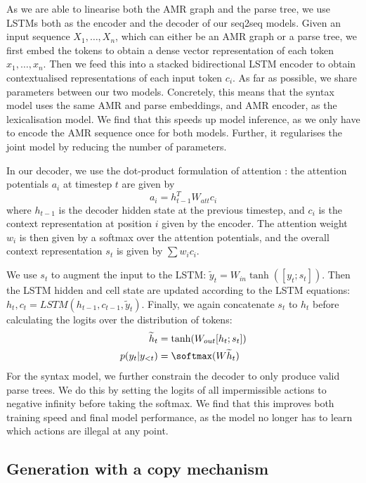 As we are able to linearise both the AMR graph and the parse tree, we use LSTMs \citep{Hochreiter:97} both as the encoder and the decoder of our seq2seq models. Given an input sequence $X_1, \dots, X_n$, which can either be an AMR graph or a parse tree, we first embed the tokens to obtain a dense vector representation of each token $x_1, \dots, x_n$. Then we feed this into a stacked bidirectional LSTM encoder to obtain contextualised representations of each input token $c_i$. As far as possible, we share parameters between our two models. Concretely, this means that the syntax model uses the same AMR and parse embeddings, and AMR encoder, as the lexicalisation model. We find that this speeds up model inference, as we only have to encode the AMR sequence once for both models. Further, it regularises the joint model by reducing the number of parameters.

In our decoder, we use the dot-product formulation of attention \citep{Luong:15}: the attention potentials $a_i$ at timestep $t$ are given by \begin{equation*}
    a_i = h_{t-1}^T W_{att} c_i
\end{equation*}
where $h_{t-1}$ is the decoder hidden state at the previous timestep, and $c_i$ is the context representation at position $i$ given by the encoder. The attention weight $w_i$ is then given by a softmax over the attention potentials, and the overall context representation $s_t$ is given by $\sum w_i c_i$.

We use $s_t$ to augment the input to the LSTM: $\widetilde{y}_t = W_{in} \tanh( [y_t; s_t])$. Then the LSTM hidden and cell state are updated according to the LSTM equations: $h_t, c_t = LSTM(h_{t-1}, c_{t-1}, \widetilde{y}_t)$. Finally, we again concatenate $s_t$ to $h_t$ before calculating the logits over the distribution of tokens: 
\begin{align}
    \widetilde{h}_t &= \tanh(W_{out}[h_t; s_t]) \\
    p(y_t | y_{<t}) &= \softmax(W \widetilde{h}_t)
    \label{eqn:lex}
\end{align}
For the syntax model, we further constrain the decoder to only produce valid parse trees. We do this by setting the logits of all impermissible actions to negative infinity before taking the softmax. We find that this improves both training speed and final model performance, as the model no longer has to learn which actions are illegal at any point.

\subsection{Generation with a copy mechanism}


